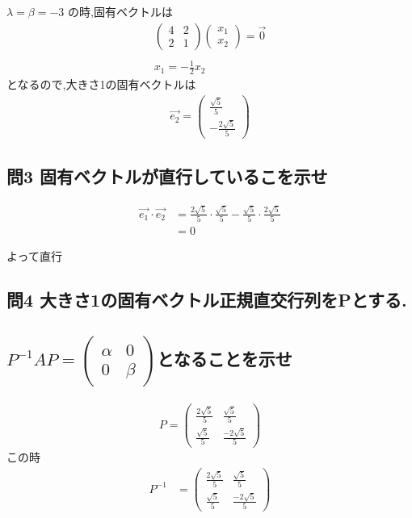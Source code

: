 \documentclass[dvipdfmx,autodetect-engine,titlepage]{jsarticle}
\begin{document}
\begin{math}
  \lambda = \beta = -3
\end{math} 
の時,固有ベクトルは
\begin{align*}
  \begin{pmatrix}
    4 & 2 \\
    2 & 1
  \end{pmatrix}
  \begin{pmatrix}
    x_1 \\
    x_2
  \end{pmatrix}
  =
  \overrightarrow{0}\\\\
  x_1 = -\frac{1}{2}x_2
\end{align*}
となるので,大きさ1の固有ベクトルは
\begin{align}
  \overrightarrow{e_2} =   \begin{pmatrix}
    \frac{\sqrt{5}}{5} \\
    -\frac{2\sqrt{5} }{5}
  \end{pmatrix}
\end{align}

\subsection*{問3 固有ベクトルが直行しているこを示せ}

\begin{align*}
  \overrightarrow{e_1}\cdot \overrightarrow{e_2} &= \frac{2\sqrt{5} }{5}\cdot \frac{\sqrt{5}}{5} - \frac{\sqrt{5}}{5} \cdot \frac{2\sqrt{5} }{5}\\
  &=0
\end{align*}

よって直行

\subsection*{問4 大きさ1の固有ベクトル正規直交行列をPとする.\\\\
\begin{math}P^{-1}AP =  \begin{pmatrix}
  \alpha  & 0 \\
  0 & \beta  
\end{pmatrix}\end{math}となることを示せ}

\begin{align*}
  P =   \begin{pmatrix}
    \frac{2\sqrt{5}}{5} & \frac{\sqrt{5}}{5} \\
    \frac{\sqrt{5}}{5} & \frac{-2\sqrt{5}}{5}
  \end{pmatrix}
\end{align*}
この時
\begin{align*}
  P^{-1} &=   
  \begin{pmatrix}
    \frac{2\sqrt{5}}{5} & \frac{\sqrt{5}}{5} \\
    \frac{\sqrt{5}}{5} & \frac{-2\sqrt{5}}{5}
  \end{pmatrix}
\end{align*}
\end{document}
